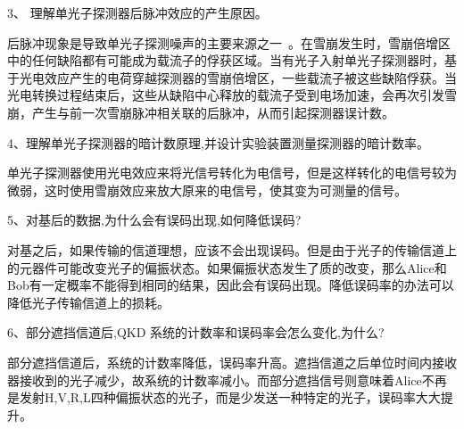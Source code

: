 \documentclass[11pt,a4paper]{ctexart}
\begin{document}
3、 理解单光子探测器后脉冲效应的产生原因。

后脉冲现象是导致单光子探测噪声的主要来源之一~\cite{back}。在雪崩发生时，雪崩倍增区中的任何缺陷都有可能成为载流子的俘获区域。当有光子入射单光子探测器时，基于光电效应产生的电荷穿越探测器的雪崩倍增区，一些载流子被这些缺陷俘获。当光电转换过程结束后，这些从缺陷中心释放的载流子受到电场加速，会再次引发雪崩，产生与前一次雪崩脉冲相关联的后脉冲，从而引起探测器误计数。

4、理解单光子探测器的暗计数原理,并设计实验装置测量探测器的暗计数率。

单光子探测器使用光电效应来将光信号转化为电信号，但是这样转化的电信号较为微弱，这时使用雪崩效应来放大原来的电信号，使其变为可测量的信号。

5、对基后的数据,为什么会有误码出现,如何降低误码?

对基之后，如果传输的信道理想，应该不会出现误码。但是由于光子的传输信道上的元器件可能改变光子的偏振状态。如果偏振状态发生了质的改变，那么Alice和Bob有一定概率不能得到相同的结果，因此会有误码出现。降低误码率的办法可以降低光子传输信道上的损耗。

6、部分遮挡信道后,QKD 系统的计数率和误码率会怎么变化,为什么?

部分遮挡信道后，系统的计数率降低，误码率升高。遮挡信道之后单位时间内接收器接收到的光子减少，故系统的计数率减小。而部分遮挡信号则意味着Alice不再是发射H,V,R,L四种偏振状态的光子，而是少发送一种特定的光子，误码率大大提升。


\end{document}
